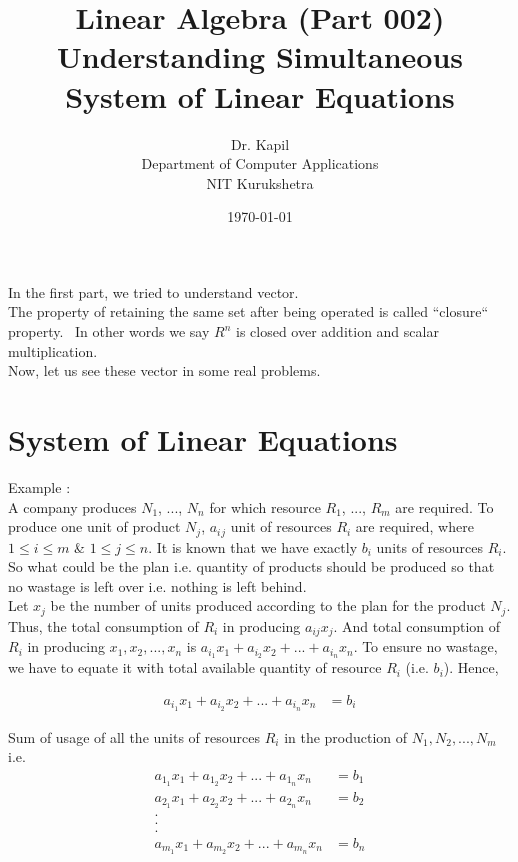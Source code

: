 \documentclass{article}
\title{Linear Algebra (Part 002)\\Understanding Simultaneous System of Linear Equations}
\author{Dr. Kapil\\Department of Computer Applications\\ NIT Kurukshetra}
\date{\today}
\begin{document}
\maketitle
In the first part, we tried to understand vector.\\
The property of retaining the same set after being operated is called ``closure`` property.~
In other words we say $R^n$ is closed over addition and scalar multiplication.\\

Now, let us see these vector in some real problems.\\

\section{System of Linear Equations}\label{first_section}
    Example : \\

A company produces $N_1$, ..., $N_n$ for which resource $R_1$, ..., $R_m$ are required. To produce one unit of product $N_j$, $a_i{}_j$ unit of resources $R_i$ are required, where $1 \leq i \leq m$ \& $1 \leq j \leq n$. It is known that we have exactly $b_i$ units of resources $R_i$. So what could be the plan i.e. quantity of products should be produced so that no wastage is left over i.e. nothing is left behind.\\

Let $x_j$ be the number of units produced according to the plan for the product $N_j$. Thus, the total consumption of $R_i$ in producing $a_{ij}x_j$. And total consumption of $R_i$ in producing $x_1,x_2,...,x_n$ is $a_i_1x_1 + a_i_2x_2 + ... + a_i_nx_n$. To ensure no wastage, we have to equate it with total available quantity of resource $R_i$ (i.e. $b_i$). Hence,

\begin{align}
   a_i_1x_1 + a_i_2x_2 + ... + a_i_nx_n & = b_i
\end{align}

Sum of usage of all the units of resources \(R_i\) in the production of \( N_1, N_2, ..., N_m\)\\

i.e.\\
\begin{align}
    a_1_1x_1 + a_1_2x_2 + ... + a_1_nx_n &= b_1\nonumber\\
    a_2_1x_1 + a_2_2x_2 + ... + a_2_nx_n &= b_2\nonumber\\
    .\nonumber\\
    .\nonumber\\
    .\nonumber\\
    a_m_1x_1 + a_m_2x_2 + ... + a_m_nx_n &= b_n\nonumber\\
\end{align}
\end{document}
